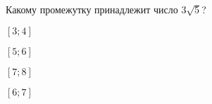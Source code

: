 \begin{ex}
	\begin{condition}
		Какому промежутку принадлежит число $3\sqrt{5}$?
		
		\selectanswer
		\begin{enumcols}[columns=4]
			\item $[3;4]$
			\item $[5;6]$
			\item $[7;8]$
			\item $[6;7]$
		\end{enumcols}
	\end{condition}
\end{ex}